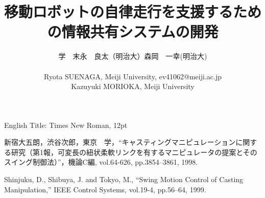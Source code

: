 \documentclass{jarticle}
\begin{document}
\makeatletter
\title{移動ロボットの自律走行を支援するための情報共有システムの開発}
{}
{English Title: Times New Roman, 12pt}
{}


\author{
\begin{tabular}{ll}
 \hspace{1zw}学\hspace{1zw}　末永　良太（明治大）\hspace{1zw}森岡　一幸(明治大)\\
 &\\
 \multicolumn{2}{l}{\small Ryota SUENAGA, Meiji University, ev41062@meiji.ac.jp}\\
 \multicolumn{2}{l}{\small Kazuyuki MORIOKA, Meiji University}\\
\end{tabular}
}
\makeatother


\date{} %

\maketitle
\thispagestyle{empty}
\pagestyle{empty}

\small

\begin{spacing}{1.2}




\end{spacing}

\footnotesize
\begin{thebibliography}{99}

新宿大五朗，渋谷次郎，東京　学，``キャスティングマニピュレーションに関する研究（第1報，可変長の紐状柔軟リンクを有するマニピュレータの提案とそのスイング制御法）''，機論C編, vol.64-626, pp.3854--3861, 1998.

Shinjuku, D., Shibuya, J. and Tokyo, M., ``Swing Motion Control of Casting Manipulation,'' IEEE Control Systems, vol.19-4, pp.56--64, 1999.

\end{thebibliography}

\normalsize
\end{document}
